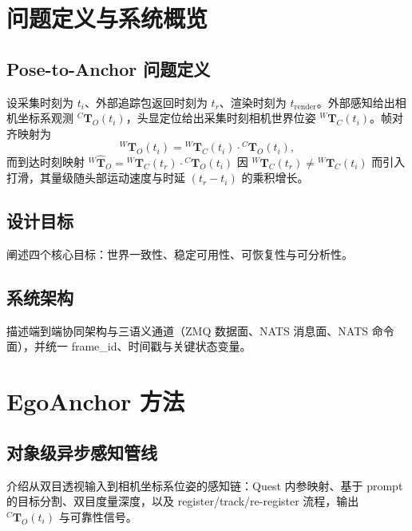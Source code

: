 \documentclass[review]{vgtc}
\begin{document}
\section{问题定义与系统概览}

\subsection{Pose-to-Anchor 问题定义}
设采集时刻为 $t_i$、外部追踪包返回时刻为 $t_r$、渲染时刻为 $t_{\text{render}}$。外部感知给出相机坐标系观测 ${}^{C}\mathbf{T}_{O}(t_i)$，头显定位给出采集时刻相机世界位姿 ${}^{W}\mathbf{T}_{C}(t_i)$。帧对齐映射为
\begin{equation}
  {}^{W}\mathbf{T}_{O}(t_i) = {}^{W}\mathbf{T}_{C}(t_i)\cdot{}^{C}\mathbf{T}_{O}(t_i),
\end{equation}
而到达时刻映射 ${}^{W}\hat{\mathbf{T}}_{O} = {}^{W}\mathbf{T}_{C}(t_r)\cdot{}^{C}\mathbf{T}_{O}(t_i)$ 因 ${}^{W}\mathbf{T}_{C}(t_r)\neq{}^{W}\mathbf{T}_{C}(t_i)$ 而引入打滑，其量级随头部运动速度与时延 $(t_r-t_i)$ 的乘积增长。

\subsection{设计目标}
阐述四个核心目标：世界一致性、稳定可用性、可恢复性与可分析性。

\subsection{系统架构}
描述端到端协同架构与三语义通道（ZMQ 数据面、NATS 消息面、NATS 命令面），并统一 frame\_id、时间戳与关键状态变量。

\section{EgoAnchor 方法}

\subsection{对象级异步感知管线}
介绍从双目透视输入到相机坐标系位姿的感知链：Quest 内参映射、基于 prompt 的目标分割、双目度量深度，以及 register/track/re-register 流程，输出 ${}^{C}\mathbf{T}_{O}(t_i)$ 与可靠性信号。
\end{document}
